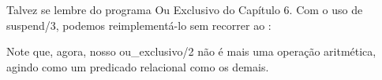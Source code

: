 \documentclass{article}
\begin{document}
Talvez se lembre do programa Ou Exclusivo do Capítulo 6. Com o uso de suspend/3, podemos reimplementá-lo sem recorrer ao :
\vspace{3cm}



Note que, agora, nosso ou\_exclusivo/2 não é mais uma operação aritmética, agindo como um predicado relacional como os demais.


\end{document}

